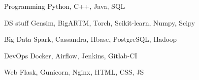 


\begin{cvskills}


\cvskill
{Programming}
{Python, C++, Java, SQL}


\cvskill
{DS stuff}
{Gensim, BigARTM, Torch, Scikit-learn, Numpy, Scipy}


\cvskill
{Big Data}
{Spark, Cassandra, Hbase, PostgreSQL, Hadoop}


\cvskill
{DevOps}
{Docker, Airflow, Jenkins, Gitlab-CI}


\cvskill
{Web}
{Flask, Gunicorn, Nginx, HTML, CSS, JS}



\end{cvskills}
